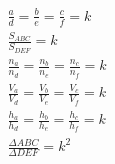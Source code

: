 \newpage
\section{
 }

\begin{figure}[h!]
	\centering
\end{figure}

\begin{gather}
	\frac{a}{d} = \frac{b}{e} = \frac{c}{f} = k \\
	\frac{S_{ABC}}{S_{DEF}} = k \\
	\frac{n_a}{n_d} = \frac{n_b}{n_e} = \frac{n_c}{n_f} = k \\
	\frac{V_a}{V_d} = \frac{V_b}{V_e} = \frac{V_c}{V_f} = k \\
	\frac{h_a}{h_d} = \frac{h_b}{h_e} = \frac{h_c}{h_f} = k \\
	\frac{\Delta ABC}{\Delta DEF} = k^2
\end{gather}
